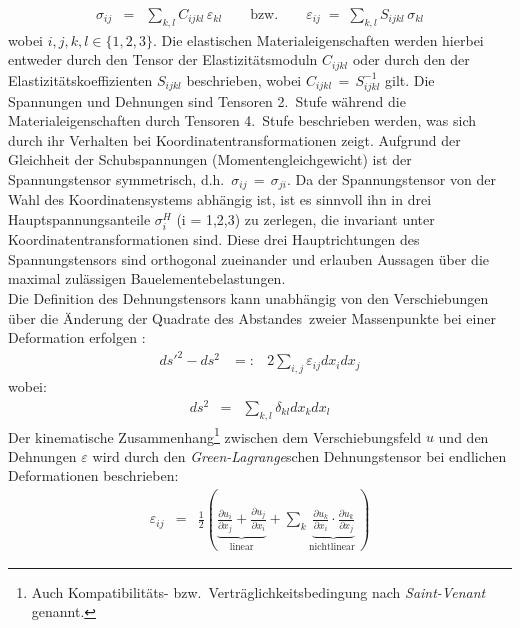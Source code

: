 %
\begin{eqnarray}
\label{matgesetz}
 \sigma_{ij} & = & \sum_{k,l}^{} C_{ijkl} \, \varepsilon_{kl}
 \qquad \mbox{bzw.} \qquad
 \varepsilon_{ij} \; = \; \sum_{k,l}^{} S_{ijkl} \, \sigma_{kl}
\end{eqnarray}
wobei $i, j, k, l \in \{1,2,3\}$.
Die elastischen Materialeigenschaften werden hierbei entweder durch den
Tensor der Elastizitätsmoduln $C_{ijkl}$ oder durch den der
Elastizitätskoeffizienten $S_{ijkl}$ beschrieben, wobei
$C_{ijkl} \, = \, S_{ijkl}^{-1}$
gilt. Die Spannungen und Dehnungen sind Tensoren 2.\ Stufe während die
Materialeigenschaften durch Tensoren 4.\ Stufe beschrieben werden, was
sich durch ihr Verhalten bei Koordinatentransformationen zeigt.
Aufgrund der Gleichheit der Schubspannungen (Momentengleichgewicht)
ist der Spannungstensor symmetrisch, d.h.\ $\sigma_{ij} \, = \, \sigma_{ji}$.
Da der Spannungstensor von der Wahl des Koordinatensystems abhängig ist, ist
es sinnvoll ihn in drei Hauptspannungsanteile $\sigma^{H}_{i}$ (i = 1,2,3)
zu zerlegen, die invariant unter Koordinatentransformationen sind. Diese
drei Hauptrichtungen des Spannungstensors sind orthogonal zueinander und
erlauben Aussagen über die maximal zulässigen Bauelementebelastungen.\\
%
Die Definition des Dehnungstensors kann unabhängig von den Verschiebungen
über die Änderung der \glqq Quadrate des Abstandes\grqq \,
zweier Massenpunkte bei einer Deformation erfolgen \cite{Lan74}:
%
\begin{eqnarray}
 ds'^{2} - ds^{2} & =: &  2 \sum_{i,j}^{} \varepsilon_{ij} dx_{i}  dx_{j}
\end{eqnarray}
%
wobei:
\begin{eqnarray*}
 ds^{2} & = & \sum_{k,l}^{} \delta_{kl} dx_{k} dx_{l}
\end{eqnarray*}
%
Der kinematische Zusammenhang\footnote{Auch Kompatibilitäts-
bzw.\ Verträglichkeitsbedingung nach {\sl Saint-Venant} genannt.}
zwischen dem Verschiebungsfeld $u$ und den
Dehnungen $\varepsilon$ wird durch den {\sl Green-Lagrange}\/schen
Dehnungstensor bei endlichen Deformationen beschrieben:
%
\begin{eqnarray}
\label{dehn}
 \varepsilon_{ij} & = & \displaystyle \frac{1}{2} \left (
 \underbrace{ \frac{\partial u_{i}}{ \partial x_{j}} +
 \frac{ \partial u_{j}}{ \partial x_{i}} }_{\mbox{linear}} +
 \sum_{k}^{} \underbrace{ \frac{ \partial u_{k}}{ \partial x_{i}}
 \cdot \frac{ \partial u_{k}}{ \partial x_{j} }}_{ \mbox{nichtlinear } }
\right )
\end{eqnarray}
